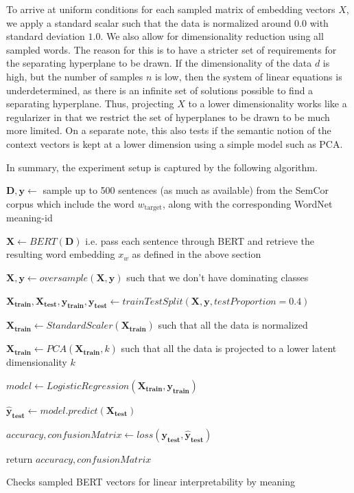 \documentclass[a4paper,12pt,twoside,openright]{report}
\begin{document}
To arrive at uniform conditions for each sampled matrix of embedding vectors $X$, we apply a standard scalar such that the data is normalized around $0.0$ with standard deviation $1.0$.
We also allow for dimensionality reduction using all sampled words.
The reason for this is to have a stricter set of requirements for the separating hyperplane to be drawn.
If the dimensionality of the data $d$ is high, but the number of samples $n$ is low, then the system of linear equations is underdetermined, as there is an infinite set of solutions possible to find a separating hyperplane.
Thus, projecting $X$ to a lower dimensionality works like a regularizer in that we restrict the set of hyperplanes to be drawn to be much more limited.
On a separate note, this also tests if the semantic notion of the context vectors is kept at a lower dimension using a simple model such as PCA.

In summary, the experiment setup is captured by the following algorithm.

\begin{algorithm}[H]
\SetAlgoLined
{}
 $\mathbf{D}, \mathbf{y} \leftarrow $  sample up to 500 sentences (as much as available) from the SemCor corpus which include the word $w_{\text{target}}$, along with the corresponding WordNet meaning-id\;

$ \mathbf{X} \leftarrow BERT( \mathbf{D} )$ i.e. pass each sentence through BERT and retrieve the resulting word embedding $x_w$ as defined in the above section\;
 
$ \mathbf{X}, \mathbf{y} \leftarrow oversample( \mathbf{X}, \mathbf{y} )$ such that we don't have dominating classes\;
 
$ \mathbf{X_\text{train}}, \mathbf{X_\text{test}}, \mathbf{y_\text{train}}, \mathbf{y_\text{test}} \leftarrow trainTestSplit( \mathbf{X}, \mathbf{y}, testProportion=0.4 )$ \;

$ \mathbf{X_\text{train}} \leftarrow StandardScaler( \mathbf{X_\text{train}})$ such that all the data is normalized\;

$ \mathbf{X_\text{train}} \leftarrow PCA( \mathbf{X_\text{train}}, k )$ such that all the data is projected to a lower latent dimensionality $k$\;

$ model \leftarrow LogisticRegression( \mathbf{X_\text{train}}, \mathbf{y_\text{train}} )$ \;
    
$ \mathbf{\hat{y}_\text{test}} \leftarrow model.predict(\mathbf{X_\text{test}})$ \;

$ accuracy, confusionMatrix \leftarrow loss(\mathbf{y_\text{test}}, \mathbf{\hat{y}_\text{test}}) $ \;
    
return $ accuracy, confusionMatrix $\;
    
 \caption{Checks sampled BERT vectors for linear interpretability by meaning}
\end{algorithm}
\end{document}

